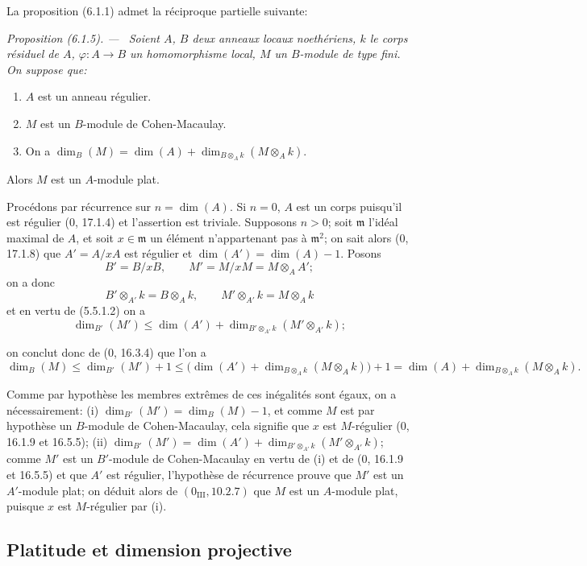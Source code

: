 \documentclass[10pt,oneside]{book}
\makeatletter
\newcommand{\oldpage}[2][]{%
  \setcounter{footnote}{0}%
  \marginpar{\scriptsize\textbf{#1}~|~#2}\ignorespaces}
\newenvironment{proposition}[1][]{%
  \par\medskip\noindent\itshape Proposition (#1). ---\ }{\par}
\newcommand{\EGAReaderTarget}[2]{\hypertarget{#1}{}\@bsphack\begingroup\def\@currentHref{#1}\label{#2}\endgroup\@esphack}
\makeatother
\begin{document}
La proposition (6.1.1) admet la réciproque partielle suivante:

\begin{proposition}[6.1.5]
\EGAReaderTarget{ega4.c04.prop.6-1-5}{IV.2.s6.1.5-fr}
Soient $A$, $B$ deux anneaux locaux noethériens, $k$ le corps résiduel de
$A$, $\varphi:A\to B$ un homomorphisme local, $M$ un $B$-module de type fini.
On suppose que:
\begin{enumerate}
\item[1\textsuperscript{o}] $A$ est un anneau régulier.
\item[2\textsuperscript{o}] $M$ est un $B$-module de Cohen-Macaulay.
\item[3\textsuperscript{o}] On a
$\dim_B(M)=\dim(A)+\dim_{B\otimes_Ak}(M\otimes_Ak)$.
\end{enumerate}
Alors $M$ est un $A$-module plat.
\end{proposition}

Procédons par récurrence sur $n=\dim(A)$. Si $n=0$, $A$ est un corps
puisqu'il est régulier (0, 17.1.4) et l'assertion est triviale. Supposons
$n>0$; soit $\mathfrak m$ l'idéal maximal de $A$, et soit
$x\in\mathfrak m$ un élément n'appartenant pas à $\mathfrak m^2$; on sait
alors (0, 17.1.8) que $A'=A/xA$ est régulier et
$\dim(A')=\dim(A)-1$. Posons
\[
B'=B/xB,\qquad M'=M/xM=M\otimes_AA';
\]
on a donc
\[
B'\otimes_{A'}k=B\otimes_Ak,\qquad
M'\otimes_{A'}k=M\otimes_Ak
\]
et en vertu de (5.5.1.2) on a
\[
\dim_{B'}(M')\leq\dim(A')+
\dim_{B'\otimes_{A'}k}(M'\otimes_{A'}k);
\]

\oldpage[IV-2]{137}

on conclut donc de (0, 16.3.4) que l'on a
\[
\dim_B(M)\leq\dim_{B'}(M')+1
\leq\bigl(\dim(A')+
\dim_{B\otimes_Ak}(M\otimes_Ak)\bigr)+1
=\dim(A)+\dim_{B\otimes_Ak}(M\otimes_Ak).
\]

Comme par hypothèse les membres extrêmes de ces inégalités sont égaux, on
a nécessairement: (i) $\dim_{B'}(M')=\dim_B(M)-1$, et comme $M$ est par
hypothèse un $B$-module de Cohen-Macaulay, cela signifie que $x$ est
$M$-régulier (0, 16.1.9 et 16.5.5); (ii)
$\dim_{B'}(M')=\dim(A')+
\dim_{B'\otimes_{A'}k}(M'\otimes_{A'}k)$; comme $M'$ est un $B'$-module de
Cohen-Macaulay en vertu de (i) et de (0, 16.1.9 et 16.5.5) et que $A'$ est
régulier, l'hypothèse de récurrence prouve que $M'$ est un $A'$-module plat;
on déduit alors de $(0_{\mathrm{III}}, 10.2.7)$ que $M$ est un $A$-module
plat, puisque $x$ est $M$-régulier par (i).

\subsection{Platitude et dimension projective}
\end{document}
